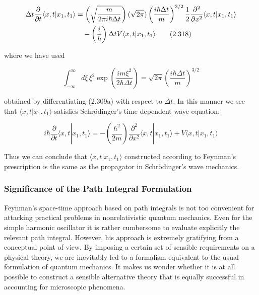 \documentclass[11pt,a4paper]{article}
\begin{document}
\begin{align}
\Delta t\frac{\partial}{\partial t}\langle x, t|x_1, t_1\rangle &= \left(\sqrt{\frac{m}{2\pi i\hbar\Delta t}}\right)(\sqrt{2\pi})\left(\frac{i\hbar\Delta t}{m}\right)^{3/2}\frac{1}{2}\frac{\partial^2}{\partial x^2}\langle x, t|x_1, t_1\rangle \notag \\
&\quad - \left(\frac{i}{\hbar}\right)\Delta t V\langle x, t|x_1, t_1\rangle
\tag{2.318}
\end{align}

where we have used

\begin{equation}
\int_{-\infty}^{\infty} d\xi\,\xi^2\exp\left(\frac{im\xi^2}{2\hbar\Delta t}\right) = \sqrt{2\pi}\left(\frac{i\hbar\Delta t}{m}\right)^{3/2}
\tag{2.319}
\end{equation}

obtained by differentiating (2.309a) with respect to $\Delta t$. In this manner we see that $\langle x, t|x_1, t_1\rangle$ satisfies Schrödinger's time-dependent wave equation:

\begin{equation}
\boxed{i\hbar\frac{\partial}{\partial t}\langle x, t|x_1, t_1\rangle = -\left(\frac{\hbar^2}{2m}\right)\frac{\partial^2}{\partial x^2}\langle x, t|x_1, t_1\rangle + V\langle x, t|x_1, t_1\rangle}
\tag{2.320}
\end{equation}

Thus we can conclude that $\langle x, t|x_1, t_1\rangle$ constructed according to Feynman's prescription is the same as the propagator in Schrödinger's wave mechanics.

\subsubsection{Significance of the Path Integral Formulation}

Feynman's space-time approach based on path integrals is not too convenient for attacking practical problems in nonrelativistic quantum mechanics. Even for the simple harmonic oscillator it is rather cumbersome to evaluate explicitly the relevant path integral. However, his approach is extremely gratifying from a conceptual point of view. By imposing a certain set of sensible requirements on a physical theory, we are inevitably led to a formalism equivalent to the usual formulation of quantum mechanics. It makes us wonder whether it is at all possible to construct a sensible alternative theory that is equally successful in accounting for microscopic phenomena.
\end{document}
